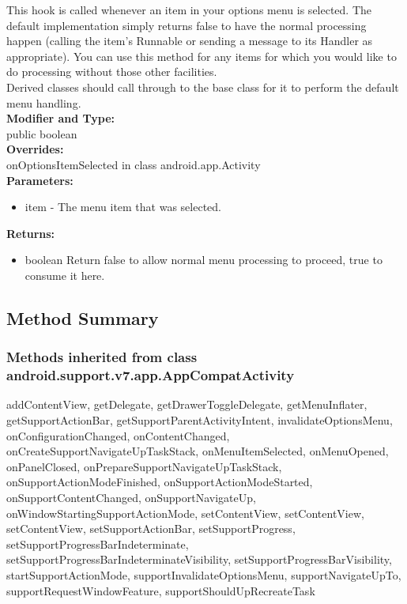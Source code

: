 This hook is called whenever an item in your options menu is selected. The default implementation simply returns false to have the normal processing happen (calling the item's Runnable or sending a message to its Handler as appropriate). You can use this method for any items for which you would like to do processing without those other facilities.\\

Derived classes should call through to the base class for it to perform the default menu handling.\\

\textbf{Modifier and Type:}\\
\tab public boolean\\


\textbf{Overrides:}\\
\tab                onOptionsItemSelected in class android.app.Activity\\

\textbf{Parameters:}
\begin{itemize}
\item item - The menu item that was selected.
\end{itemize}

\textbf{Returns:}
\begin{itemize}
\item boolean Return false to allow normal menu processing to proceed, true to consume it here.
\end{itemize}


\subsection{Method Summary}

\subsubsection{Methods inherited from class android.support.v7.app.AppCompatActivity}

addContentView, getDelegate, getDrawerToggleDelegate, getMenuInflater, getSupportActionBar, getSupportParentActivityIntent, invalidateOptionsMenu, onConfigurationChanged, onContentChanged, onCreateSupportNavigateUpTaskStack, onMenuItemSelected, onMenuOpened, onPanelClosed, onPrepareSupportNavigateUpTaskStack, onSupportActionModeFinished, onSupportActionModeStarted, onSupportContentChanged, onSupportNavigateUp, onWindowStartingSupportActionMode, setContentView, setContentView, setContentView, setSupportActionBar, setSupportProgress, setSupportProgressBarIndeterminate, setSupportProgressBarIndeterminateVisibility, setSupportProgressBarVisibility, startSupportActionMode, supportInvalidateOptionsMenu, supportNavigateUpTo, supportRequestWindowFeature, supportShouldUpRecreateTask\\

